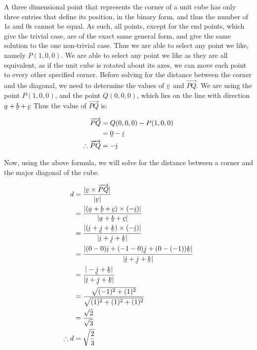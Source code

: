 \documentclass[a4paper]{article}
\begin{document}
\begin{enumerate}[label=\textbf{\arabic*.}]
\begin{enumerate}
		A three dimensional point that represents the corner of a unit cube has only three entries that define its position, in the binary form, and thus the number of 1s and 0s cannot be equal. As such, all points, except for the end points, which give the trivial case, are of the exact same general form, and give the same solution to the one non-trivial case. Thus we are able to select any point we like, namely $P(1,0,0)$. We are able to select any point we like as they are all equivalent, as if the unit cube is rotated about its axes, we can move each point to every other specified corner. 
		\bigbreak
		Before solving for the distance between the corner and the diagonal, we need to determine the values of $\underaccent{\tilde}{v}$ and $\overrightarrow{PQ}$. We are using the point $P(1,0,0)$, and the point $Q(0,0,0)$, which lies on the line with direction $\underaccent{\tilde}{a} + \underaccent{\tilde}{b} + \underaccent{\tilde}{c}$ Thus the value of $\overrightarrow{PQ}$ is:

		\begin{align*}
		\overrightarrow{PQ} & = Q(0,0,0) - P(1,0,0)\\
		& = \underaccent{\tilde}{0} - \underaccent{\tilde}{i}\\
		\therefore \overrightarrow{PQ} & = -\underaccent{\tilde}{i}\\
		\end{align*}

		Now, using the above formula, we will solve for the distance between a corner and the major diagonal of the cube.

		\begin{align*}
		d & = \frac{|\underaccent{\tilde}{v}\times\overrightarrow{PQ}|}{|\underaccent{\tilde}{v}|}\\
		& = \frac{|(\underaccent{\tilde}{a} + \underaccent{\tilde}{b} + \underaccent{\tilde}{c})\times(-\underaccent{\tilde}{i})|}{|\underaccent{\tilde}{a} + \underaccent{\tilde}{b} + \underaccent{\tilde}{c}|}\\
		& = \frac{|(\underaccent{\tilde}{i} + \underaccent{\tilde}{j} + \underaccent{\tilde}{k})\times(-\underaccent{\tilde}{i})|}{|\underaccent{\tilde}{i} + \underaccent{\tilde}{j} + \underaccent{\tilde}{k}|}\\
		& = \frac{|(0-0)\underaccent{\tilde}{i} + (-1-0)\underaccent{\tilde}{j} + (0-(-1))\underaccent{\tilde}{k}|}{|\underaccent{\tilde}{i} + \underaccent{\tilde}{j} + \underaccent{\tilde}{k}|}\\
		& = \frac{| -\underaccent{\tilde}{j} + \underaccent{\tilde}{k}|}{|\underaccent{\tilde}{i} + \underaccent{\tilde}{j} + \underaccent{\tilde}{k}|}\\
		& = \frac{\sqrt{(-1)^2 + (1)^2}}{\sqrt{(1)^2 + (1)^2 + (1)^2}}\\
		& = \frac{\sqrt{2}}{\sqrt{3}}\\
		\therefore d & = \sqrt{\frac{2}{3}}\\
		\end{align*}


\end{enumerate}
\end{enumerate}
\end{document}
